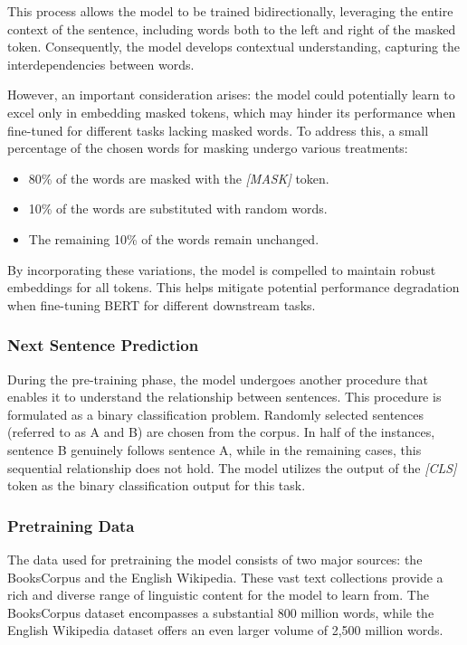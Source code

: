 \documentclass[a4paper,10pt]{report} %
\begin{document}
This process allows the model to be trained bidirectionally, leveraging the entire context of the sentence, including words both to the left and right of the masked token. Consequently, the model develops contextual understanding, capturing the interdependencies between words.

However, an important consideration arises: the model could potentially learn to excel only in embedding masked tokens, which may hinder its performance when fine-tuned for different tasks lacking masked words. To address this, a small percentage of the chosen words for masking undergo various treatments:

\begin{itemize}
  \item 80\% of the words are masked with the \textit{[MASK]} token.
  \item 10\% of the words are substituted with random words.
  \item The remaining 10\% of the words remain unchanged.
\end{itemize}

By incorporating these variations, the model is compelled to maintain robust embeddings for all tokens. This helps mitigate potential performance degradation when fine-tuning BERT for different downstream tasks. \cite{bert}

\subsubsection{Next Sentence Prediction}
During the pre-training phase, the model undergoes another procedure that enables it to understand the relationship between sentences. This procedure is formulated as a binary classification problem. Randomly selected sentences (referred to as A and B) are chosen from the corpus. In half of the instances, sentence B genuinely follows sentence A, while in the remaining cases, this sequential relationship does not hold. The model utilizes the output of the \textit{[CLS]} token as the binary classification output for this task. \cite{bert}

\subsubsection{Pretraining Data}
The data used for pretraining the model consists of two major sources: the BooksCorpus and the English Wikipedia. These vast text collections provide a rich and diverse range of linguistic content for the model to learn from. The BooksCorpus dataset encompasses a substantial 800 million words, while the English Wikipedia dataset offers an even larger volume of 2,500 million words. 
\end{document}
